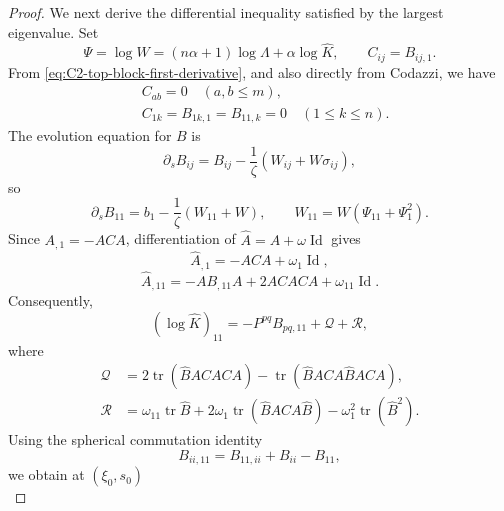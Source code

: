 \documentclass[11pt, reqno]{amsart}
\theoremstyle{remark}
\theoremstyle{definition}
\numberwithin{equation}{section}
\DeclareMathOperator{\tr}{tr}
\newcommand{\Id}{\operatorname{Id}}
\begin{document}
\begin{proof}
We next derive the differential inequality satisfied by the largest eigenvalue. Set
\begin{equation*}
        \Psi=\log W=(n\alpha+1)\log\Lambda+\alpha\log\widehat K,
        \qquad
        C_{ij}=B_{ij,1}.
\end{equation*}
From \eqref{eq:C2-top-block-first-derivative}, and also directly from Codazzi, we have
\begin{equation}\label{eq:C2-C-vanishing}
\begin{aligned}
       &  C_{ab}=0\quad(a,b\le m),\\
       & C_{1k}=B_{1k,1}=B_{11,k}=0\quad(1\le k\le n).   
\end{aligned}
\end{equation}
The evolution equation for $B$ is
\begin{equation*}
        \partial_sB_{ij}=B_{ij}-\frac1\zeta(W_{ij}+W\sigma_{ij}),
\end{equation*}
so
\begin{equation*}
        \partial_sB_{11}=b_1-\frac1\zeta(W_{11}+W),
        \qquad
        W_{11}=W(\Psi_{11}+\Psi_1^2).
\end{equation*}
Since $A_{,1}=-ACA$, differentiation of
$\widehat A=A+\omega\Id$ gives
\begin{equation*}
        \widehat A_{,1}=-ACA+\omega_1\Id,
\end{equation*}
\begin{equation*}
        \widehat A_{,11}
        =-AB_{,11}A+2A C A C A+\omega_{11}\Id.
\end{equation*}
Consequently,
\begin{equation*}
        (\log\widehat K)_{11}
        =-P^{pq}B_{pq,11}+\mathcal Q+\mathcal R,
\end{equation*}
where
\begin{equation}\label{eq:C2-QR-definition}
\begin{split}
        \mathcal Q
        &=2\tr(\widehat B A C A C A)
          -\tr(\widehat B A C A\widehat B A C A),\\
        \mathcal R
        &=\omega_{11}\tr\widehat B
          +2\omega_1\tr(\widehat B A C A\widehat B)
          -\omega_1^2\tr(\widehat B^2).
\end{split}
\end{equation}
Using the spherical commutation identity
\begin{equation*}
        B_{ii,11}=B_{11,ii}+B_{ii}-B_{11},
\end{equation*}
we obtain at $(\xi_0,s_0)$
\begin{equation}\label{eq:C2-LB11}

\end{equation}
\end{proof}
\end{document}
